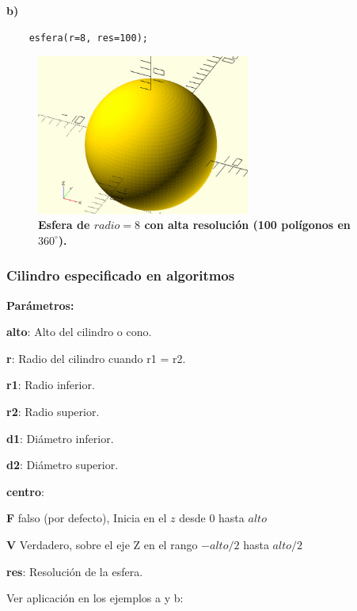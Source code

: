 \textbf{b)} 

\begin{verbatim}
    esfera(r=8, res=100); 
\end{verbatim}

\begin{figure}[h]
\includegraphics[width=7cm]{Img/Modelos/modelado4.jpg}
\centering
\caption{\textbf{ \footnotesize{Esfera de $radio=8$ con alta resolución (100 polígonos en $360^\circ$).}}}
\end{figure}

\clearpage
\subsubsection{Cilindro especificado en algoritmos}
\begin{description}
\item  \textbf{Parámetros:}
\item  \textbf{alto}: Alto del cilindro o cono.
\item  \textbf{r}: Radio del cilindro cuando r1 = r2.
\item  \textbf{r1}: Radio inferior.
\item  \textbf{r2}: Radio superior.
\item  \textbf{d1}: Diámetro inferior.
\item  \textbf{d2}: Diámetro superior.
\item   \textbf{centro}:
\begin{description}
\item \textbf{F} falso (por defecto), Inicia en el $z$ desde $0$ hasta $alto$
\item \textbf{V} Verdadero, sobre el eje Z en el rango $-alto/2$ hasta $alto/2$

\end{description}
\item \textbf{res}: Resolución de la esfera.
\end{description}

Ver aplicación en los ejemplos a y b:

